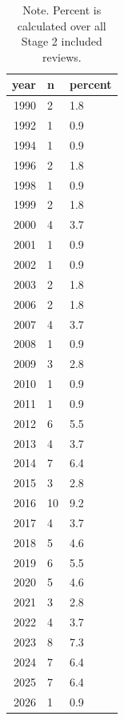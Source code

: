 \begin{table}[htbp]
\raggedright
\caption{Publication year distribution among included reviews.}
\label{tab.publication.year}
\begin{tabular}{rll}
\toprule
year & n & percent \\
\midrule
1990 & 2 & 1.8 \\
1992 & 1 & 0.9 \\
1994 & 1 & 0.9 \\
1996 & 2 & 1.8 \\
1998 & 1 & 0.9 \\
1999 & 2 & 1.8 \\
2000 & 4 & 3.7 \\
2001 & 1 & 0.9 \\
2002 & 1 & 0.9 \\
2003 & 2 & 1.8 \\
2006 & 2 & 1.8 \\
2007 & 4 & 3.7 \\
2008 & 1 & 0.9 \\
2009 & 3 & 2.8 \\
2010 & 1 & 0.9 \\
2011 & 1 & 0.9 \\
2012 & 6 & 5.5 \\
2013 & 4 & 3.7 \\
2014 & 7 & 6.4 \\
2015 & 3 & 2.8 \\
2016 & 10 & 9.2 \\
2017 & 4 & 3.7 \\
2018 & 5 & 4.6 \\
2019 & 6 & 5.5 \\
2020 & 5 & 4.6 \\
2021 & 3 & 2.8 \\
2022 & 4 & 3.7 \\
2023 & 8 & 7.3 \\
2024 & 7 & 6.4 \\
2025 & 7 & 6.4 \\
2026 & 1 & 0.9 \\
\bottomrule
\end{tabular}

\caption*{Note. Percent is calculated over all Stage 2 included reviews.}
\end{table}
